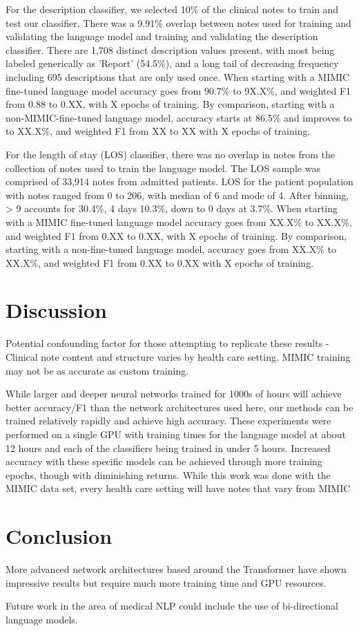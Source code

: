 \documentclass{amia}
\begin{document}
For the description classifier, we selected 10\% of the clinical notes to train and test our classifier. There was a 9.91\% overlap between notes used for training and validating the language model and training and validating the description classifier. There are 1,708 distinct description values present, with most being labeled generically as 'Report' (54.5\%), and a long tail of decreasing frequency including 695 descriptions that are only used once. When starting with a MIMIC fine-tuned language model accuracy goes from 90.7\% to 9X.X\%, and weighted F1 from 0.88 to 0.XX, with X epochs of training. By comparison, starting with a non-MIMIC-fine-tuned language model, accuracy starts at 86.5\% and improves to to XX.X\%, and weighted F1 from XX to XX with X epochs of training.

For the length of stay (LOS) classifier, there was no overlap in notes from the collection of notes used to train the language model. The LOS sample was comprised of 33,914 notes from admitted patients. LOS for the patient population with notes ranged from 0 to 206, with median of 6 and mode of 4. After binning, > 9 accounts for 30.4\%, 4 days 10.3\%, down to 0 days at 3.7\%. When starting with a MIMIC fine-tuned language model accuracy goes from XX.X\% to XX.X\%, and weighted F1 from 0.XX to 0.XX, with X epochs of training. By comparison, starting with a non-fine-tuned language model, accuracy goes from XX.X\% to XX.X\%, and weighted F1 from 0.XX to 0.XX with X epochs of training.

\section*{Discussion}

Potential confounding factor for those attempting to replicate these results - Clinical note content and structure varies by health care setting. MIMIC training may not be as accurate as custom training.

While larger and deeper neural networks trained for 1000s of hours will achieve better accuracy/F1 than the network architectures used here, our methods can be trained relatively rapidly and achieve high accuracy. These experiments were performed on a single GPU with training times for the language model at about 12 hours and each of the classifiers being trained in under 5 hours. Increased accuracy with these specific models can be achieved through more training epochs, though with diminishing returns. 
While this work was done with the MIMIC data set, every health care setting will have notes that vary from MIMIC

\section*{Conclusion}

More advanced network architectures based around the Transformer\cite{vaswani_attention_2017} have shown impressive results but require much more training time and GPU resources. 

Future work in the area of medical NLP could include the use of bi-directional language models.




\end{document}
